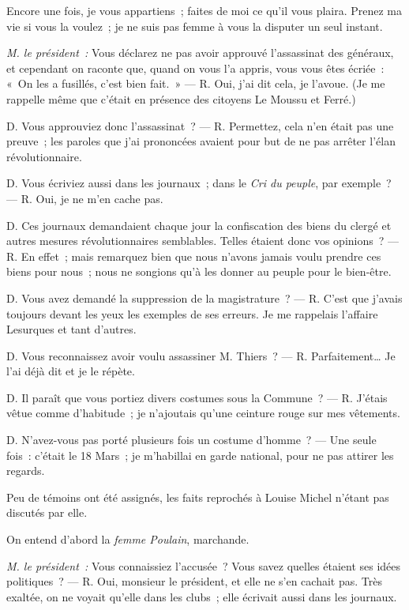 \documentclass[french,twoside]{book} %
\begin{document}
Encore une fois, je vous appartiens ; faites de moi ce qu’il vous plaira. Prenez ma vie si vous la voulez ; je ne suis pas femme à vous la disputer un seul instant.\par
\emph{M. le président :} Vous déclarez ne pas avoir approuvé l’assassinat des généraux, et cependant on raconte que, quand on vous l’a appris, vous vous êtes écriée : « On les a fusillés, c’est bien fait. » — R. Oui, j’ai dit cela, je l’avoue. (Je me rappelle même que c’était en présence des citoyens Le Moussu et Ferré.)\par
D. Vous approuviez donc l’assassinat ? — R. Permettez, cela n’en était pas une preuve ; les paroles que j’ai prononcées avaient pour but de ne pas arrêter l’élan révolutionnaire.\par
D. Vous écriviez aussi dans les journaux ; dans le \emph{Cri du peuple}, par exemple ? — R. Oui, je ne m’en cache pas.\par
D. Ces journaux demandaient chaque jour la confiscation des biens du clergé et autres mesures révolutionnaires semblables. Telles étaient donc vos opinions ? — R. En effet ; mais remarquez bien que nous n’avons jamais voulu prendre ces biens pour nous ; nous ne songions qu’à les donner au peuple pour le bien-être.\par
D. Vous avez demandé la suppression de la magistrature ? — R. C’est que j’avais toujours devant les yeux les exemples de ses erreurs. Je me rappelais l’affaire Lesurques et tant d’autres.\par
 D. Vous reconnaissez avoir voulu assassiner M. Thiers ? — R. Parfaitement… Je l’ai déjà dit et je le répète.\par
D. Il paraît que vous portiez divers costumes sous la Commune ? — R. J’étais vêtue comme d’habitude ; je n’ajoutais qu’une ceinture rouge sur mes vêtements.\par
D. N’avez-vous pas porté plusieurs fois un costume d’homme ? — Une seule fois : c’était le 18 Mars ; je m’habillai en garde national, pour ne pas attirer les regards.\par
\bigbreak
\noindent Peu de témoins ont été assignés, les faits reprochés à Louise Michel n’étant pas discutés par elle.\par
On entend d’abord la \emph{femme Poulain}, marchande.\par
\bigbreak
\noindent \emph{M. le président :} Vous connaissiez l’accusée ? Vous savez quelles étaient ses idées politiques ? — R. Oui, monsieur le président, et elle ne s’en cachait pas. Très exaltée, on ne voyait qu’elle dans les clubs ; elle écrivait aussi dans les journaux.\par
\end{document}
